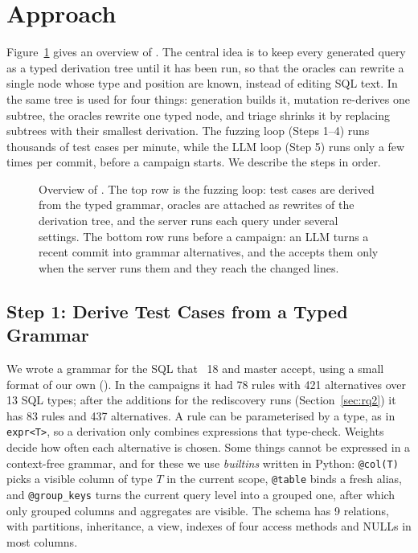 \section{Approach}
\label{sec:approach}

Figure~\ref{fig:overview} gives an overview of \tool. The central idea is to
keep every generated query as a typed derivation tree until it has been run, so
that the oracles can rewrite a single node whose type and position are known,
instead of editing SQL text. In \tool the same tree is used for four things:
generation builds it, mutation re-derives one subtree, the oracles rewrite one
typed node, and triage shrinks it by replacing subtrees with their smallest
derivation. The fuzzing loop (Steps 1--4) runs thousands of test cases per
minute, while the LLM loop (Step 5) runs only a few times per commit, before a
campaign starts. We describe the steps in order.

\begin{figure}[t]
  \centering
  
  \caption{Overview of \tool. The top row is the fuzzing loop: test cases are
  derived from the typed grammar, oracles are attached as rewrites of the
  derivation tree, and the server runs each query under several settings.
  The bottom row runs before a campaign: an LLM turns a recent commit into
  grammar alternatives, and the \gate accepts them only when the server runs
  them and they reach the changed lines.}
  \label{fig:overview}
\end{figure}

\subsection{Step 1: Derive Test Cases from a Typed Grammar}
\label{sec:grammar}

We wrote a grammar for the SQL that \pg~18 and master accept, using a small
format of our own (\pgg). In the campaigns it had 78 rules with 421 alternatives
over 13 SQL types; after the additions for the rediscovery runs
(Section~\ref{sec:rq2}) it has 83 rules and 437 alternatives. A rule can be
parameterised by a type, as in \texttt{expr<T>}, so a derivation only combines
expressions that type-check. Weights decide how often each alternative is
chosen. Some things cannot be expressed in a context-free grammar, and for these
we use \emph{builtins} written in Python: \texttt{@col(T)} picks a visible column
of type $T$ in the current scope, \texttt{@table} binds a fresh alias, and
\texttt{@group\_keys} turns the current query level into a grouped one, after
which only grouped columns and aggregates are visible. The schema has 9
relations, with partitions, inheritance, a view, indexes of four access methods
and NULLs in most columns.

